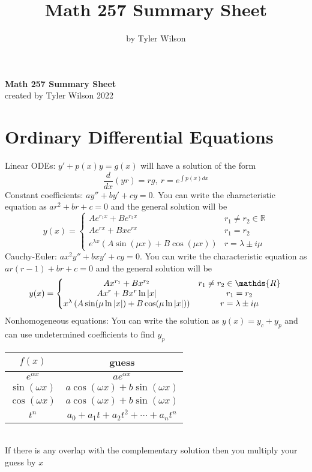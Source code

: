 \documentclass[11pt, fleqn]{article}
\title{Math 257 Summary Sheet}
\author{by Tyler Wilson}
\date{}
\newcommand{\<}{\langle}
\renewcommand{\>}{\rangle}
\newcommand{\brround}[1]{\left( #1 \right)}
\newcommand{\eqnsystem}[1]{\left\{\begin{matrix} #1 \end{matrix}\right.}
\newcommand{\R}{\mathds{R}}
\begin{document}
\allowdisplaybreaks
\begin{center}
    \huge{
    \textbf{Math 257 Summary Sheet}}\\
    \vspace{0.2cm}
    \normalsize created by Tyler Wilson 2022
\end{center}

\section*{Ordinary Differential Equations}
Linear ODEs: $y'+p(x)y=g(x)$ will have a solution of the form
$$\frac{d}{dx}(yr)=rg,\ r=e^{\int p(x)dx}$$
Constant coefficients: $ay''+by'+cy=0$. You can write the characteristic equation as $ar^2+br+c=0$ and the general solution will be
$$y(x)=\eqnsystem{Ae^{r_1x}+Be^{r_2x} & r_1\neq r_2\in\R\\ Ae^{rx}+Bxe^{rx} & r_1=r_2\\ e^{\lambda x}\brround{A\sin(\mu x)+B\cos(\mu x)} & r=\lambda\pm i\mu}$$
Cauchy-Euler: $ax^2y''+bxy'+cy=0$. You can write the characteristic equation as ${ar(r-1)+br+c=0}$ and the general solution will be
$$y(x)=\eqnsystem{Ax^{r_1}+Bx^{r_2} & r_1\neq r_2\in\R\\ Ax^r+Bx^r\ln|x| & r_1=r_2\\ x^\lambda\brround{A\sin(\mu\ln|x|)+B\cos(\mu\ln|x|)} & r=\lambda\pm i\mu}\\ $$
Nonhomogeneous equations: You can write the solution as $y(x)=y_c+y_p$ and can use undetermined coefficients to find $y_p$\\
\begin{tabular}{c|c}
    $f(x)$ & guess\\
    \hline
    $e^{\alpha x}$ & $ae^{\alpha x}$\\
    $\sin(\omega x)$ & $a\cos(\omega x)+b\sin(\omega x)$\\
    $\cos(\omega x)$ & $a\cos(\omega x)+b\sin(\omega x)$\\
    $t^n$ & $a_0+a_1t+a_2t^2+\cdots+a_nt^n$
\end{tabular}\\
If there is any overlap with the complementary solution then you multiply your guess by $x$
\end{document}
